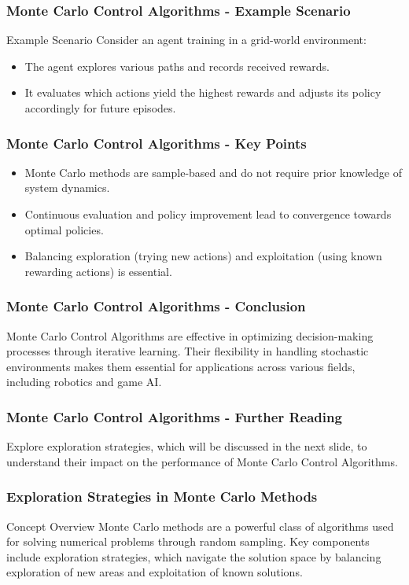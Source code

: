 \documentclass[aspectratio=169]{beamer}
\begin{document}
\begin{frame}[fragile]
    \frametitle{Monte Carlo Control Algorithms - Example Scenario}
    \begin{block}{Example Scenario}
        Consider an agent training in a grid-world environment:
        \begin{itemize}
            \item The agent explores various paths and records received rewards.
            \item It evaluates which actions yield the highest rewards and adjusts its policy accordingly for future episodes.
        \end{itemize}
    \end{block}
\end{frame}

\begin{frame}[fragile]
    \frametitle{Monte Carlo Control Algorithms - Key Points}
    \begin{itemize}
        \item Monte Carlo methods are sample-based and do not require prior knowledge of system dynamics.
        \item Continuous evaluation and policy improvement lead to convergence towards optimal policies.
        \item Balancing exploration (trying new actions) and exploitation (using known rewarding actions) is essential.
    \end{itemize}
\end{frame}

\begin{frame}[fragile]
    \frametitle{Monte Carlo Control Algorithms - Conclusion}
    Monte Carlo Control Algorithms are effective in optimizing decision-making processes through iterative learning. Their flexibility in handling stochastic environments makes them essential for applications across various fields, including robotics and game AI.
\end{frame}

\begin{frame}[fragile]
    \frametitle{Monte Carlo Control Algorithms - Further Reading}
    Explore exploration strategies, which will be discussed in the next slide, to understand their impact on the performance of Monte Carlo Control Algorithms.
\end{frame}

\begin{frame}[fragile]
    \frametitle{Exploration Strategies in Monte Carlo Methods}
    \begin{block}{Concept Overview}
        Monte Carlo methods are a powerful class of algorithms used for solving numerical problems through random sampling. Key components include exploration strategies, which navigate the solution space by balancing exploration of new areas and exploitation of known solutions.
    \end{block}
\end{frame}
\end{document}
